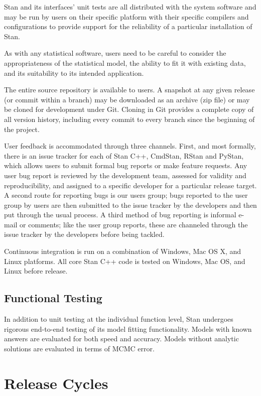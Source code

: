 Stan and its interfaces' unit tests are all distributed with the
system software and may be run by users on their specific platform
with their specific compilers and configurations to provide support
for the reliability of a particular installation of Stan.

As with any statistical software, users need to be careful to consider
the appropriateness of the statistical model, the ability to fit it
with existing data, and its suitability to its intended application.

The entire source repository is available to users.  A snapshot at any
given release (or commit within a branch) may be downloaded as an
archive (zip file) or may be cloned for development under Git.
Cloning in Git provides a complete copy of all version history,
including every commit to every branch since the beginning of the
project.  

User feedback is accommodated through three channels. First, and most
formally, there is an issue tracker for each of Stan C++, CmdStan,
RStan and PyStan, which allows users to submit formal bug reports or
make feature requests.  Any user bug report is reviewed by the
development team, assessed for validity and reproducibility, and
assigned to a specific developer for a particular release target.
A second route for reporting bugs is our users group;  bugs reported
to the user group by users are then submitted to the issue tracker by
the developers and then put through the usual process.  A third method
of bug reporting is informal e-mail or comments; like the user group
reports, these are channeled through the issue tracker by the
developers before being tackled.

Continuous integration is run on a combination of Windows, Mac OS X,
and Linux platforms.  All core Stan C++ code is tested on Windows, Mac
OS, and Linux before release.


\subsection{Functional Testing}

In addition to unit testing at the individual function level, Stan
undergoes rigorous end-to-end testing of its model fitting
functionality. Models with known answers are evaluated for both speed
and accuracy. Models without analytic solutions are evaluated in terms
of MCMC error.  


\section{Release Cycles}

